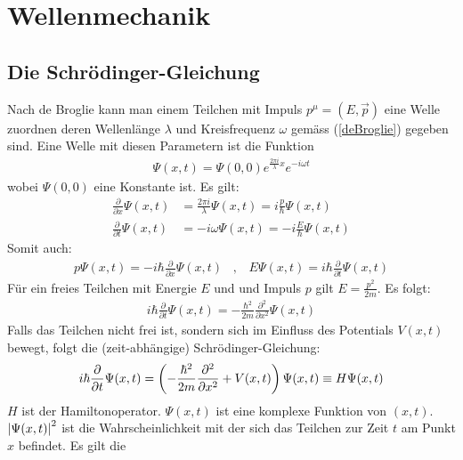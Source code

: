 \section{Wellenmechanik}

\subsection{Die Schrödinger-Gleichung}

Nach de Broglie kann man einem Teilchen mit Impuls $p^\mu = (E,\vec{p})$ eine
Welle zuordnen deren Wellenlänge $\lambda$ und Kreisfrequenz $\omega$ gemäss
(\ref{deBroglie}) gegeben sind. Eine Welle mit diesen Parametern ist die
Funktion
\begin{align*}
    \Psi(x,t) = \Psi(0,0) e^{\frac{2 \pi i}{\lambda} x} e^{-i \omega t}
\end{align*}
wobei $\Psi(0,0)$ eine Konstante ist. Es gilt:
\begin{align*}
    \frac{\partial}{\partial x} \Psi(x,t)
        &= \frac{2 \pi i}{\lambda} \Psi(x,t)
        = i \frac{p}{\hbar} \Psi(x,t)
    \\
    \frac{\partial}{\partial t} \Psi(x,t)
        &= -i \omega \Psi(x,t)
        = -i \frac{E}{\hbar} \Psi(x,t)
\end{align*}
Somit auch:
\begin{align*}
    p \Psi (x,t) = -i \hbar \frac{\partial}{\partial x} \Psi(x,t)
    \hspace{10pt} , \hspace{10pt}
    E \Psi(x,t) = i \hbar \frac{\partial}{\partial t} \Psi(x,t)
\end{align*}
Für ein freies Teilchen mit Energie $E$ und und Impuls $p$ gilt $E = \frac{p^2}{2m}$.
Es folgt:
\begin{align*}
    i \hbar \frac{\partial}{\partial t} \Psi(x,t)
    = - \frac{\hbar^2}{2m} \frac{\partial^2}{\partial x^2} \Psi(x,t)
\end{align*}
Falls das Teilchen nicht frei ist, sondern sich im Einfluss des Potentials
$V(x,t)$ bewegt, folgt die (zeit-abhängige) Schrödinger-Gleichung:
\begin{align}\label{ZeitunabhaengigeSG}
    i \hbar \frac{\partial}{\partial t} \Psi(x,t) =
    \left( - \frac{\hbar^2}{2 m} \frac{\partial^2}{\partial x^2} + V(x,t) \right) \Psi(x,t)
    \equiv H \Psi(x,t)
\end{align}
$H$ ist der Hamiltonoperator. $\Psi(x,t)$ ist eine komplexe Funktion von
$(x,t)$. $\left\vert \Psi(x,t) \right\vert^2$ ist die Wahrscheinlichkeit mit der sich das
Teilchen zur Zeit $t$ am Punkt $x$ befindet. Es gilt die
